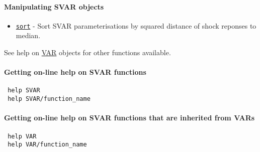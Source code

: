  \paragraph{Manipulating SVAR objects}
 
 \begin{itemize}
 \item
   \href{SVAR/sort}{\texttt{sort}} - Sort SVAR parameterisations by
   squared distance of shock reponses to median.
 \end{itemize}
 
 See help on \href{VAR/Contents}{VAR} objects for other functions
 available.
 
 \paragraph{Getting on-line help on SVAR functions}
 
 \begin{verbatim}
 help SVAR
 help SVAR/function_name
 \end{verbatim}
 
 \paragraph{Getting on-line help on SVAR functions that are inherited
 from VARs}
 
 \begin{verbatim}
 help VAR
 help VAR/function_name
 \end{verbatim}



